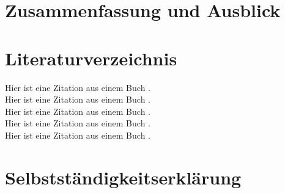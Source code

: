 \documentclass[a4paper,12pt]{article}
\begin{document}
\section{Zusammenfassung und Ausblick}
\newpage


\section{Literaturverzeichnis} 
Hier ist eine Zitation aus einem Buch \cite{BayesStatistik}. \\
Hier ist eine Zitation aus einem Buch \cite{EinfBayesStatistik}. \\
Hier ist eine Zitation aus einem Buch \cite{MonteCarloAlgorithmen}. \\
Hier ist eine Zitation aus einem Buch \cite{StatistikKlassischOderBayes}. \\
Hier ist eine Zitation aus einem Buch \cite{EinfBayesStatistikOptimalerStichprobenumfang}. \\

\printbibliography 
\newpage

\section{Selbstständigkeitserklärung}
\end{document}

